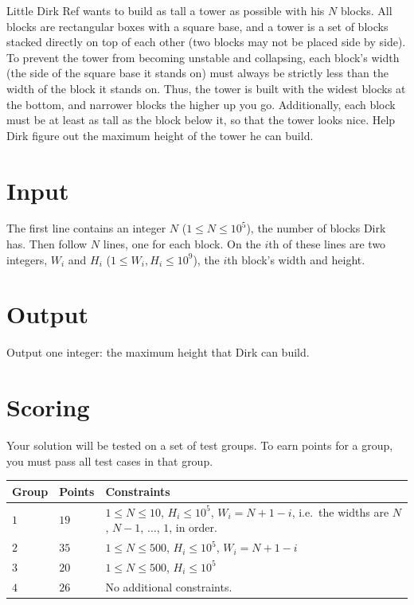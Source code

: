 Little Dirk Ref wants to build as tall a tower as possible with his $N$ blocks. All blocks are rectangular boxes with a square base,
and a tower is a set of blocks stacked directly on top of each other (two blocks may not be placed side by side).
To prevent the tower from becoming unstable and collapsing, each block's width (the side of the square base it stands on)
must always be strictly less than the width of the block it stands on. Thus, the tower is built with the widest blocks at the bottom, and narrower
blocks the higher up you go. Additionally, each block must be at least as tall as the block below it, so that the tower looks nice.
Help Dirk figure out the maximum height of the tower he can build.

\section*{Input}
The first line contains an integer $N$ ($1 \leq N \leq 10^5$), the number of blocks Dirk has.
Then follow $N$ lines, one for each block. On the $i$th of these lines are two integers, $W_i$ and $H_i$ ($1 \leq W_i, H_i \leq 10^9$),
the $i$th block's width and height.

\section*{Output}
Output one integer: the maximum height that Dirk can build.

\section*{Scoring}
Your solution will be tested on a set of test groups. To earn points for a group, you must pass all test cases in that group.


\noindent
\begin{tabular}{| l | l | p{12cm} |}
  \hline
  \textbf{Group} & \textbf{Points} & \textbf{Constraints} \\ \hline
  $1$    & $19$      & $1 \leq N \leq 10$, $H_i \le 10^5$, $W_i = N+1 - i$, i.e.\ the widths are $N$, $N-1$, $\dots$, $1$, in order. \\ \hline
  $2$    & $35$      & $1 \leq N \leq 500$, $H_i \le 10^5$, $W_i = N+1 - i$ \\ \hline
  $3$    & $20$      & $1 \leq N \leq 500$, $H_i \le 10^5$ \\ \hline
  $4$    & $26$      & No additional constraints.  \\ \hline
\end{tabular}
